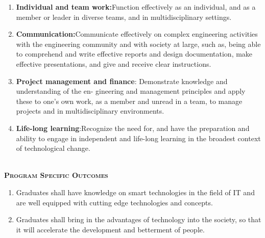 \documentclass[10pt,a4paper]{report}
\begin{document}
\begin{center}
\begin{center}
\begin{enumerate}
and norms of the engineering practice
\vspace{0.5cm}
\item \textbf{\large Individual and team work:}\large Function effectively as an individual, and as a member or
leader in diverse teams, and in multidisciplinary settings. ~
\vspace{0.5cm}
\item \textbf{\large Communication:}\large Communicate effectively on complex engineering activities with the
engineering community and with society at large, such as, being able to comprehend and
write effective reports and design documentation, make effective presentations, and give
and receive clear instructions. ~
\vspace{0.5cm}
\item \textbf{\large Project management and finance}\large: Demonstrate knowledge and understanding of the en-
gineering and management principles and apply these to one’s own work, as a member
and unread in a team, to manage projects and in multidisciplinary environments.~
\vspace{0.5cm}
\item \textbf{\large Life-long learning}\large :Recognize the need for, and have the preparation and ability to
engage in independent and life-long learning in the broadest context of technological
change.~

\end{enumerate}

\thispagestyle{empty}

\end{center}



\begin{center}

\textsc{\large\bfseries }\\
[0.50cm]
\textsc{\large\bfseries\upshape Program Specific Outcomes}\\
[0.70cm]
\justify
\begin{enumerate}
\item\large Graduates shall have knowledge on smart technologies in the field of IT and are well equipped
with cutting edge technologies and concepts.
\vspace{0.1cm}
\item\large Graduates shall bring in the advantages of technology into the society, so that it will accelerate the development and betterment of people.

\end{enumerate}

\end{center}

\end{center}
\end{document}
